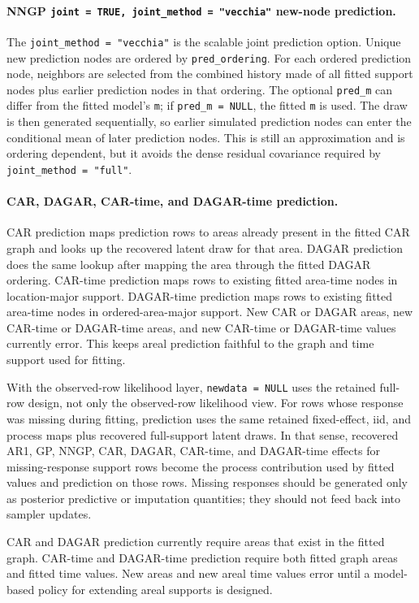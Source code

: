 \documentclass[11pt]{article}
\begin{document}
\paragraph{NNGP \texttt{joint = TRUE, joint\_method = "vecchia"} new-node prediction.}
The \texttt{joint\_method = "vecchia"} is the scalable joint prediction option. Unique new prediction nodes are ordered by \texttt{pred\_ordering}. For each ordered prediction node, neighbors are selected from the combined history made of all fitted support nodes plus earlier prediction nodes in that ordering. The optional \texttt{pred\_m} can differ from the fitted model's \texttt{m}; if \texttt{pred\_m = NULL}, the fitted \texttt{m} is used. The draw is then generated sequentially, so earlier simulated prediction nodes can enter the conditional mean of later prediction nodes. This is still an approximation and is ordering dependent, but it avoids the dense residual covariance required by \texttt{joint\_method = "full"}.

\paragraph{CAR, DAGAR, CAR-time, and DAGAR-time prediction.}
CAR prediction maps prediction rows to areas already present in the fitted CAR graph and looks up the recovered latent draw for that area. DAGAR prediction does the same lookup after mapping the area through the fitted DAGAR ordering. CAR-time prediction maps rows to existing fitted area-time nodes in location-major support. DAGAR-time prediction maps rows to existing fitted area-time nodes in ordered-area-major support. New CAR or DAGAR areas, new CAR-time or DAGAR-time areas, and new CAR-time or DAGAR-time values currently error. This keeps areal prediction faithful to the graph and time support used for fitting.

With the observed-row likelihood layer, \texttt{newdata = NULL} uses the retained full-row design, not only the observed-row likelihood view. For rows whose response was missing during fitting, prediction uses the same retained fixed-effect, iid, and process maps plus recovered full-support latent draws. In that sense, recovered AR1, GP, NNGP, CAR, DAGAR, CAR-time, and DAGAR-time effects for missing-response support rows become the process contribution used by fitted values and prediction on those rows. Missing responses should be generated only as posterior predictive or imputation quantities; they should not feed back into sampler updates.

CAR and DAGAR prediction currently require areas that exist in the fitted graph. CAR-time and DAGAR-time prediction require both fitted graph areas and fitted time values. New areas and new areal time values error until a model-based policy for extending areal supports is designed.
\end{document}
